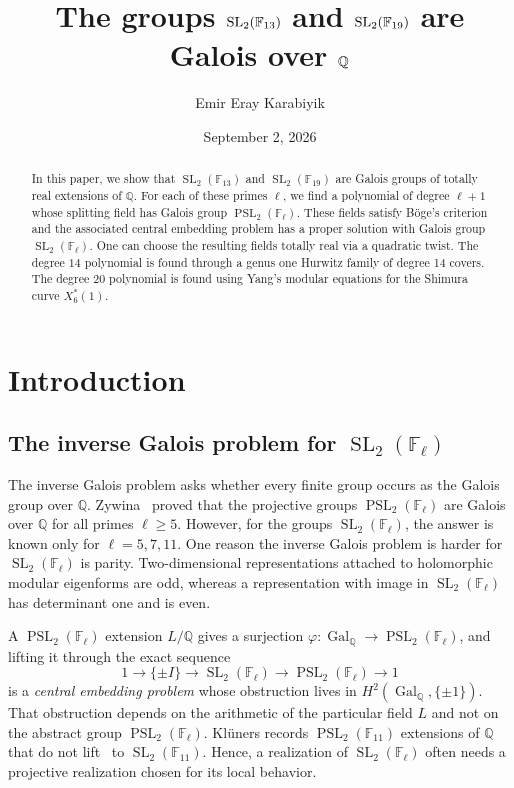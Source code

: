 \documentclass[10pt]{amsart}
\title{The groups
  $\SL_2(\F_{13})$ and $\SL_2(\F_{19})$ are Galois over $\Q$}
\author{Emir Eray Karabiyik}
\date{September 2, 2026}
\numberwithin{equation}{section}
\newcommand{\GQ}{\Gal_{\Q}}
\theoremstyle{definition}
\theoremstyle{remark}
\newcommand{\QQ}{\mathbb Q}
\newcommand{\F}{\mathbb{F}}
\newcommand{\Q}{\mathbb{Q}}
\newcommand{\SL}{\operatorname{SL}}
\newcommand{\PSL}{\operatorname{PSL}}
\newcommand{\Gal}{\operatorname{Gal}}
\begin{document}
\begin{abstract}
In this paper, we show that $\SL_2(\F_{13})$ and $\SL_2(\F_{19})$ are Galois groups of
totally real extensions of $\Q$. For each of these primes $\ell$, we find a polynomial of degree $\ell+1$ whose splitting field has Galois group $\PSL_2(\F_\ell)$. These fields satisfy B\"oge's criterion and the associated central embedding problem has a proper solution with Galois group $\SL_2(\F_\ell)$. One can choose the resulting fields totally real via a quadratic twist. The degree $14$ polynomial is found through a genus one Hurwitz family of degree 14 covers. The degree 20 polynomial is found using Yang's modular equations for the Shimura curve $X_6^*(1)$. 




\end{abstract}

\maketitle

\section{Introduction}\label{sec:introduction}

\subsection{The inverse Galois problem for \texorpdfstring{$\SL_2(\F_\ell)$}
  {SL2(Fl)}}\label{subsec:intro-statement}
The inverse Galois problem asks whether every finite group occurs as the
Galois group over $\Q$. Zywina~\cite{Zywina2015} proved that the projective groups $\PSL_2(\F_\ell)$ are Galois over $\QQ$ for all primes $\ell\geq 5$. However, for the groups $\SL_2(\F_\ell)$, the answer is known only for $\ell=5,7,11$. One reason the inverse Galois problem is harder for
  $\SL_2(\F_\ell)$ is parity.  Two-dimensional representations attached to
  holomorphic modular eigenforms are odd, whereas a representation with
  image in $\SL_2(\F_\ell)$ has determinant one and is even.
 
A $\PSL_2(\F_\ell)$ extension $L/\Q$
gives a surjection $\varphi\colon\GQ\to\PSL_2(\F_\ell)$, and lifting it through the exact sequence
\begin{equation}\label{eq:central-extension}
 1\longrightarrow\{\pm I\}\longrightarrow\SL_2(\F_\ell)
 \longrightarrow\PSL_2(\F_\ell)\longrightarrow1
\end{equation}
is a \emph{central embedding problem} whose obstruction lives in
$H^2(\GQ,\{\pm1\})$. That obstruction depends on the arithmetic of the
particular field $L$ and not on the abstract group $\PSL_2(\F_\ell)$. Kl\"uners records $\PSL_2(\F_{11})$ extensions of $\Q$
that do not lift~\cite{Klueners2000} to $\SL_2(\F_{11})$. Hence, a realization of $\SL_2(\F_\ell)$
often needs a projective realization chosen for its local behavior.
\end{document}
